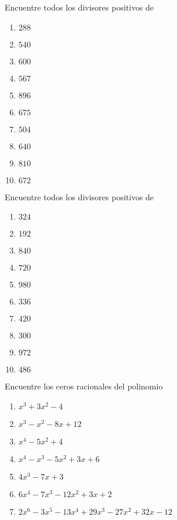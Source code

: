  
 	\begin{problema}
 		Encuentre todos los divisores positivos de 
 		\begin{multicols}{2}
 			\begin{enumerate}
 				\item $288$
 				\item $540$
 				\item $600$
 				\item $567$
 				\item $896$
 				\item $675$
 				\item $504$
 				\item $640$
 				\item $810$
 				\item $672$
 			\end{enumerate}
 			
 		\end{multicols}
 		
 	\end{problema}
 
 
 
 	\begin{problema}
 		Encuentre todos los divisores positivos de
 		\begin{multicols}{2}
 			\begin{enumerate}
 				\item $324$
 				\item $192$
 				\item $840$
 				\item $720$
 				\item $980$
 				\item $336$
 				\item $420$
 				\item $300$
 				\item $972$
 				\item $486$
 			\end{enumerate}
 			
 		\end{multicols}
 		
 	\end{problema}
 	
 
 
 
 	\begin{problema} Encuentre los ceros racionales del polinomio
 		\begin{multicols}{2} 
 			\begin{enumerate}
 				\item $x^{3}+3x^{2}-4$
 				\item $x^{3}-x^{2}-8x+12$
 				\item $x^{4}-5x^{2}+4$
 				\item $x^{4}-x^{3}-5x^{2}+3x+6$
 				\item $4x^{3}-7x+3$
 				\item $6x^{4}-7x^{3}-12x^{2}+3x+2$
 				\item $2x^{6}-3x^{5}-13x^{4}+29x^{3}-27x^{2}+32x-12$
 			\end{enumerate}
 			
 		\end{multicols}
 	\end{problema}
 
